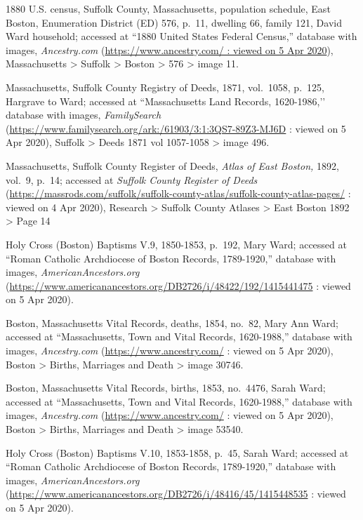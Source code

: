 \begin{thebibliography}{99}
	1880 U.S. census, Suffolk County, Massachusetts, population schedule, East Boston, Enumeration District (ED) 576, p.\ 11, dwelling 66, family 121, David Ward household; accessed at ``1880 United States Federal Census,'' database with images, \textit{Ancestry.com} (\url{https://www.ancestry.com/ : viewed on 5 Apr 2020}), Massachusetts > Suffolk > Boston > 576 > image 11.
	
	Massachusetts, Suffolk County Registry of Deeds, 1871, vol.\ 1058, p.\ 125, Hargrave to Ward; accessed at ``Massachusetts Land Records, 1620-1986,’’ database with images, \textit{FamilySearch} (\url{https://www.familysearch.org/ark:/61903/3:1:3QS7-89Z3-MJ6D} : viewed on 5 Apr 2020), Suffolk > Deeds 1871 vol 1057-1058 > image 496.
	
	Massachusetts, Suffolk County Register of Deeds, \textit{Atlas of East Boston,} 1892, vol.\ 9, p.\ 14; accessed at \textit{Suffolk County Register of Deeds} (\url{https://massrods.com/suffolk/suffolk-county-atlas/suffolk-county-atlas-pages/} : viewed on 4 Apr 2020), Research > Suffolk County Atlases > East Boston 1892 > Page 14
	
	Holy Cross (Boston) Baptisms V.9, 1850-1853, p.\ 192, Mary Ward; accessed at ``Roman Catholic Archdiocese of Boston Records, 1789-1920,'' database with images, \textit{AmericanAncestors.org} (\url{https://www.americanancestors.org/DB2726/i/48422/192/1415441475} : viewed on 5 Apr 2020).	
	
	Boston, Massachusetts Vital Records, deaths, 1854, no.\ 82, Mary Ann Ward; accessed at ``Massachusetts, Town and Vital Records, 1620-1988,'' database with images, \textit{Ancestry.com} (\url{https://www.ancestry.com/} : viewed on 5 Apr 2020), Boston > Births, Marriages and Death > image 30746.
	
	Boston, Massachusetts Vital Records, births, 1853, no.\ 4476, Sarah Ward; accessed at ``Massachusetts, Town and Vital Records, 1620-1988,'' database with images, \textit{Ancestry.com} (\url{https://www.ancestry.com/} : viewed on 5 Apr 2020), Boston > Births, Marriages and Death > image 53540.
	
	Holy Cross (Boston) Baptisms V.10, 1853-1858, p.\ 45, Sarah Ward; accessed at ``Roman Catholic Archdiocese of Boston Records, 1789-1920,'' database with images, \textit{AmericanAncestors.org} (\url{https://www.americanancestors.org/DB2726/i/48416/45/1415448535} : viewed on 5 Apr 2020).	
	

\end{thebibliography}
